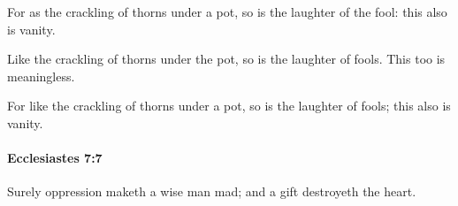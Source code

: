 			\begin{versebox}
					\item[BHS] 
					\item[LXX] 
					\item[ASV] For as the crackling of thorns under a pot, so is the laughter of the fool: this also is vanity.
					\item[NIV] Like the crackling of thorns under the pot, so is the laughter of fools. This too is meaningless.
					\item[NRSV] For like the crackling of thorns under a pot, so is the laughter of fools; this also is vanity.
			\end{versebox}

		\paragraph{Ecclesiastes 7:7} %
			\label{ECCLESIASTES-7-7}

			Surely oppression maketh a wise man mad; and a gift destroyeth the heart.

